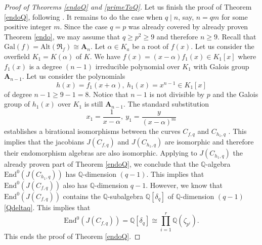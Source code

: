 \documentclass[12pt,a4paper,reqno]{amsart}
\def\Q{{\mathbb Q}}
\def\R{{\mathbb R}}
\def\R{{\mathfrak R}}
\def\Gal{\mathrm{Gal}}
\def\Alt{\mathrm{Alt}}
\def\End{\mathrm{End}}
\theoremstyle{definition}
\begin{document}
\begin{proof}[Proof of Theorems \ref{endoQ} and \ref{primeToQ}]
Let us finish the proof of Theorem \ref{endoQ}, following \cite[Remark 4.3 and Proof of Th. 5.2 on p. 360]{ZarhinM}. It remains to do the case  when $q \mid n$, say, $n=qm$ for some positive integer $m$.
Since the case $q=p$ was already covered by already proven Theorem \ref{endo}, we may assume that
$q\ge p^2 \ge 9$ and therefore $n \ge 9$. Recall that $\Gal(f)=\Alt(\R_f) \cong \mathbf{A}_n$.
Let $\alpha \in K_a$ be a root of $f(x)$. Let us consider the overfield $K_1=K(\alpha)$ of $K$. We have
$f(x)=(x-\alpha)f_1(x)\in K_1[x]$ where $f_1(x)$ is a degree $(n-1)$ irreducible polynomial over $K_1$
with Galois group $\mathbf{A}_{n-1}$.  Let us consider the polynomials
$$h(x)=f_1(x+\alpha), \ h_1(x)=x^{n-1}\in K_1[x]$$
of degree $n-1 \ge 9-1=8$. Notice that $n-1$ is not divisible by $p$ and the Galois group of $h_1(x)$ over $K_1$
is still $\mathbf{A}_{n-1}$.   The standard substitution  
$$x_1=\frac{1}{x-\alpha}, \ y_1=\frac{y}{(x-\alpha)^m}$$
establishes a birational isomorphisms between the curves $C_{f,q}$ and $C_{h_1,q}$ \cite[p. 3359]{Towse}.
This implies that the jacobians $J(C_{f,q})$ and $J(C_{h_1,q})$ are isomorphic and therefore their endomorphism algebras
are also isomorphic. Applying to $J(C_{h_1,q})$ the already proven part of Theorem \ref{endoQ}, we conclude
that the $\Q$-algebra $\End^0(J(C_{h_1,q}))$ has $\Q$-dimension $(q-1)$. This implies that $\End^0(J(C_{f,q}))$ also has $\Q$-dimension $q-1$. However, we know that  $\End^0(J(C_{f,q}))$
contains the $\Q$-subalgebra $\Q[\delta_q]$ of $\Q$-dimension $(q-1)$ \eqref{Qdeltaq}. This implies that 
$$\End^0(J(C_{f,q}))=\Q[\delta_q]\cong \prod_{i=1}^r \Q(\zeta_{p^i}).$$
This ends the proof of Theorem \ref{endoQ}.  









\end{proof}
\end{document}
